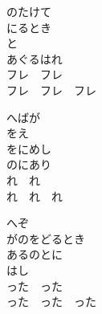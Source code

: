 \documentclass[10pt,b5j]{tarticle} %
\begin{document}
\vspace{1.5em} %
\newcommand{\linespace}{0.5em} %
\newcommand{\blocksize}{0.5\hsize} %
\begin{enumerate} %
    \begin{minipage}[c]{\blocksize}
    
        \vspace{\linespace}
        \item
        のたけて\\
        にるとき\\
        と\\
        あぐるはれ\\
        フレ　フレ\\
        フレ　フレ　フレ
        
        \vspace{\linespace}
        \item
        へばが\\
        をえ\\
        をにめし\\
        のにあり\\
        れ　れ\\
        れ　れ　れ
        
        \vspace{\linespace}
        \item
        へぞ\\
        がのをどるとき\\
        あるのとに\\
        はし\\
        った　った\\
        った　った　った
    
    \end{minipage}
\end{enumerate} %
\end{document}
